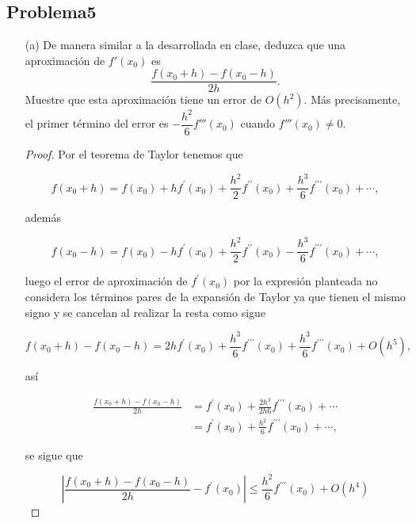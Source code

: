 \documentclass[12pt, a4paper]{article}%
\begin{document}
\subsection*{Problema5}
\begin{itemize}
    \item[(a)] De manera similar a la desarrollada en clase, deduzca que una aproximación de \( f'(x_0) \) es
    \[
    \dfrac{f(x_0 + h) - f(x_0 - h)}{2h}.
    \]
    Muestre que esta aproximación tiene un error de \( O(h^2) \). Más precisamente, el primer término del error es \( -\dfrac{h^2}{6} f'''(x_0) \) cuando \( f'''(x_0) \neq 0 \).

\begin{proof}
Por el teorema de Taylor tenemos que

$$
f\left(x_0+h\right)=f\left(x_0\right)+h f^{\prime}\left(x_0\right)+\frac{h^2}{2}  f^{\prime \prime}\left(x_0\right)+\frac{h^3}{6} f^{\prime \prime \prime}\left(x_0\right)+\cdots,
$$

además
    
$$
f\left(x_0-h\right)=f\left(x_0\right)-h f^{\prime}\left(x_0\right)+\frac{h^2}{2}  f^{\prime \prime}\left(x_0\right)-\frac{h^3}{6} f^{\prime \prime \prime}\left(x_0\right)+\cdots,
$$

luego el error de aproximación de $f^{\prime}\left(x_0\right)$ por la expresión planteada no considera los términos pares de la expansión de Taylor ya que tienen el mismo signo y se cancelan al realizar la resta como sigue

$$
f\left(x_0+h\right)-f\left(x_0-h\right)=2 h f^{\prime}\left(x_0\right)+\frac{h^3}{6} f^{\prime \prime \prime}\left(x_0\right)+\frac{h^3}{6} f^{\prime \prime \prime}\left(x_0\right)+O(h^5),
$$

así

$$
\begin{aligned}
\frac{f\left(x_0+h\right)-f\left(x_0-h\right)}{2 h} & =f^{\prime}\left(x_0\right)+\frac{ 2h^3}{2h6} f^{\prime \prime \prime}\left(x_0\right)+\cdots \\
& =f^{\prime}\left(x_0\right)+\frac{h^2}{6} f^{\prime \prime \prime}\left(x_0\right)+\cdots,
\end{aligned}
$$

se sigue que


$$\left|\frac{f\left(x_0+h\right)-f\left(x_0-h\right)}{2 h}-f^{\prime}(x_0)\right|\leq \frac{h^2}{6} f^{\prime \prime \prime}\left(x_0\right)+O(h^4)$$

\end{proof}
    

\end{itemize}
\end{document}
